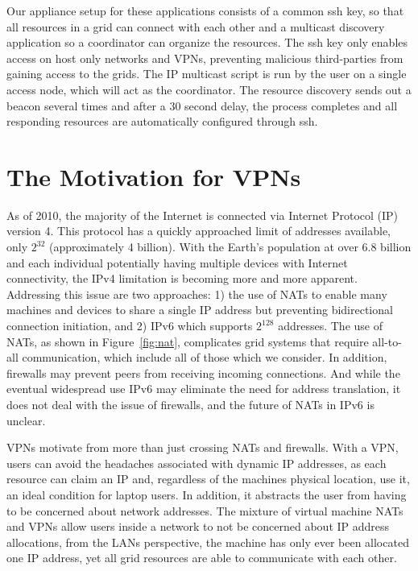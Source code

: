 \documentclass[conference]{IEEEtran}
\begin{document}
Our appliance setup for these applications consists of a common ssh key, so
that all resources in a grid can connect with each other and a multicast
discovery application so a coordinator can organize the resources.  The ssh key
only enables access on host only networks and VPNs, preventing malicious
third-parties from gaining access to the grids.  The IP multicast script is run
by the user on a single access node, which will act as the coordinator.  The
resource discovery sends out a beacon several times and after a 30 second
delay, the process completes and all responding resources are automatically
configured through ssh.

\section{The Motivation for VPNs}
\label{vpns}

As of 2010, the majority of the Internet is connected via Internet Protocol
(IP) version 4.  This protocol has a quickly approached limit of addresses
available,  only $2^{32}$ (approximately 4 billion).  With the Earth's
population at over 6.8 billion and each individual potentially having multiple
devices with Internet connectivity, the IPv4 limitation is becoming more and
more apparent.  Addressing this issue are two approaches:  1) the use of NATs
to enable many machines and devices to share a single IP address but preventing
bidirectional connection initiation, and 2) IPv6 which supports $2^{128}$
addresses.  The use of NATs, as shown in Figure~\ref{fig:nat}, complicates grid
systems that require all-to-all communication, which include all of those which
we consider.  In addition, firewalls may prevent peers from receiving incoming
connections.  And while the eventual widespread use IPv6 may eliminate the need
for address translation, it does not deal with the issue of firewalls, and the
future of NATs in IPv6 is unclear.

VPNs motivate from more than just crossing NATs and firewalls.  With a VPN,
users can avoid the headaches associated with dynamic IP addresses, as each
resource can claim an IP and, regardless of the machines physical location, use
it, an ideal condition for laptop users.  In addition, it abstracts the user
from having to be concerned about network addresses.  The mixture of virtual
machine NATs and VPNs allow users inside a network to not be concerned about IP
address allocations, from the LANs perspective, the machine has only ever been
allocated one IP address, yet all grid resources are able to communicate with
each other.
\end{document}
